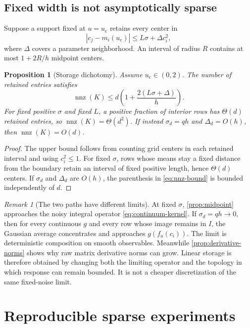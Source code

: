 \documentclass[11pt]{article}
\newtheorem{proposition}[theorem]{Proposition}
\theoremstyle{definition}
\theoremstyle{remark}
\newtheorem{remark}[theorem]{Remark}
\newcommand{\uc}{u_{\mathrm c}}
\begin{document}
\subsection{Fixed width is not asymptotically sparse}

Suppose a support fixed at $u=\uc$ retains every center in
\[
  |c_j-m_i(\uc)|\le L\sigma+\Delta c_i^2,
\]
where $\Delta$ covers a parameter neighborhood.  An interval of radius $R$
contains at most $1+2R/h$ midpoint centers.

\begin{proposition}[Storage dichotomy]\label{prop:storage}
Assume $\uc\in(0,2)$.
The number of retained entries satisfies
\begin{equation}\label{eq:nnz-bound}
  \operatorname{nnz}(K)
  \le d\left(1+\frac{2(L\sigma+\Delta)}h\right).
\end{equation}
For fixed positive $\sigma$ and fixed $L$, a positive fraction of interior
rows has $\Theta(d)$ retained entries, so
$\operatorname{nnz}(K)=\Theta(d^2)$.  If instead
$\sigma_d=qh$ and $\Delta_d=O(h)$, then
$\operatorname{nnz}(K)=O(d)$.
\end{proposition}

\begin{proof}
The upper bound follows from counting grid centers in each retained
interval and using $c_i^2\le1$.  For fixed $\sigma$, rows whose means stay a
fixed distance from the boundary retain an interval of fixed positive
length, hence $\Theta(d)$ centers.  If $\sigma_d$ and $\Delta_d$ are
$O(h)$, the parenthesis in \eqref{eq:nnz-bound} is bounded independently of
$d$.
\end{proof}

\begin{remark}[The two paths have different limits]\label{rem:two-paths}
At fixed $\sigma$, \cref{prop:midpoint} approaches the noisy integral
operator \eqref{eq:continuum-kernel}.  If $\sigma_d=qh\to0$, then for every
continuous $g$ and every row whose image remains in $I$, the Gaussian
average concentrates and approaches $g(f_u(c_i))$.  The limit is
deterministic composition on smooth observables.  Meanwhile
\cref{prop:derivative-norms} shows why raw matrix derivative norms can grow.
Linear storage is therefore obtained by changing both the limiting operator
and the topology in which response can remain bounded.  It is not a cheaper
discretization of the same fixed-noise limit.
\end{remark}

\section{Reproducible sparse experiments}
\label{sec:experiments}
\end{document}
